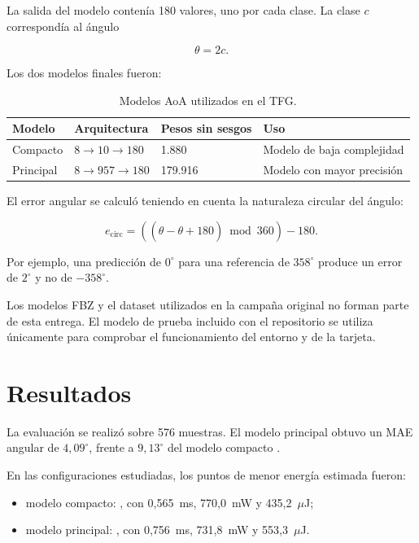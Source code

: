 La salida del modelo contenía 180 valores, uno por cada clase. La clase $c$ correspondía
al ángulo

\begin{equation}
\theta = 2c.
\end{equation}

Los dos modelos finales fueron:

\begin{table}[H]
\centering
\caption{Modelos AoA utilizados en el TFG.}
\label{tab:tfg-models}
\begin{tabularx}{\textwidth}{@{}L{0.23\textwidth}L{0.28\textwidth}L{0.23\textwidth}Y@{}}
\toprule
\textbf{Modelo} & \textbf{Arquitectura} & \textbf{Pesos sin sesgos} & \textbf{Uso} \\
\midrule
Compacto &
$8\rightarrow10\rightarrow180$ &
1.880 &
Modelo de baja complejidad \\

Principal &
$8\rightarrow957\rightarrow180$ &
179.916 &
Modelo con mayor precisión \\
\bottomrule
\end{tabularx}
\end{table}

El error angular se calculó teniendo en cuenta la naturaleza circular del ángulo:

\begin{equation}
e_{\mathrm{circ}}
=
((\hat{\theta}-\theta+180)\bmod 360)-180.
\end{equation}

Por ejemplo, una predicción de $0^\circ$ para una referencia de $358^\circ$ produce
un error de $2^\circ$ y no de $-358^\circ$.

Los modelos FBZ y el dataset utilizados en la campaña original no forman parte de esta
entrega. El modelo de prueba incluido con el repositorio se utiliza únicamente para comprobar
el funcionamiento del entorno y de la tarjeta.

\section{Resultados}

La evaluación se realizó sobre 576 muestras. El modelo principal obtuvo un MAE angular
de $4{,}09^\circ$, frente a $9{,}13^\circ$ del modelo compacto
\cite{poveda_tfg_2026}.

En las configuraciones estudiadas, los puntos de menor energía estimada fueron:

\begin{itemize}
  \item modelo compacto: , con 0,565~ms,
        770,0~mW y 435,2~$\mu$J;

  \item modelo principal: , con 0,756~ms,
        731,8~mW y 553,3~$\mu$J.
\end{itemize}

